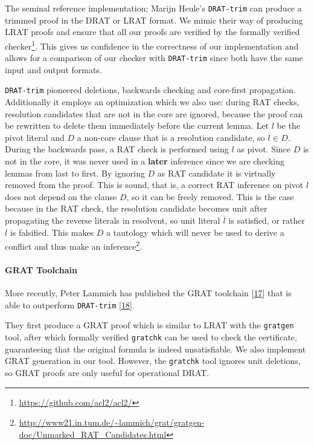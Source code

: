 \documentclass[
]{report}
\begin{document}
The seminal reference implementation; Marijn Heule's \texttt{DRAT-trim}
can produce a trimmed proof in the DRAT or LRAT format. We mimic their
way of producing LRAT proofs and ensure that all our proofs are verified
by the formally verified checker\footnote{\url{https://github.com/acl2/acl2/}}.
This gives us confidence in the correctness of our implementation and
allows for a comparison of our checker with \texttt{DRAT-trim} since
both have the same input and output formats.

\texttt{DRAT-trim} pioneered deletions, backwards checking and
core-first propagation. Additionally it employs an optimization which we
also use: during RAT checks, resolution candidates that are not in the
core are ignored, because the proof can be rewritten to delete them
immediately before the current lemma. Let \(l\) be the pivot literal and
\(D\) a non-core clause that is a resolution candidate, so
\(\overline{l} \in D\). During the backwards pass, a RAT check is
performed using \(l\) as pivot. Since \(D\) is not in the core, it was
never used in a \textbf{later} inference since we are checking lemmas
from last to first. By ignoring \(D\) as RAT candidate it is virtually
removed from the proof. This is sound, that is, a correct RAT inference
on pivot \(l\) does not depend on the clause \(D\), so it can be freely
removed. This is the case because in the RAT check, the resolution
candidate becomes unit after propagating the reverse literals in
resolvent, so unit literal \(\overline{l}\) is satisfied, or rather
\(l\) is falsified. This makes \(D\) a tautology which will never be
used to derive a conflict and thus make an inference\footnote{\url{http://www21.in.tum.de/~lammich/grat/gratgen-doc/Unmarked_RAT_Candidates.html}}.

\paragraph{GRAT Toolchain}

More recently, Peter Lammich has published the GRAT toolchain
{[}\protect\hyperlink{ref-lammich2017grat}{17}{]} that is able to
outperform \texttt{DRAT-trim}
{[}\protect\hyperlink{ref-lammich2017efficient}{18}{]}.

They first produce a GRAT proof which is similar to LRAT with the
\texttt{gratgen} tool, after which formally verified \texttt{gratchk}
can be used to check the certificate, guaranteeing that the original
formula is indeed unsatisfiable. We also implement GRAT generation in
our tool. However, the \texttt{gratchk} tool ignores unit deletions, so
GRAT proofs are only useful for operational DRAT.
\end{document}
